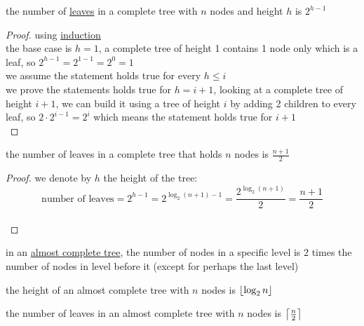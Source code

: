 \documentclass[a4paper,12pt]{article}
\DeclarePairedDelimiter\ceil{\lceil}{\rceil}
\DeclarePairedDelimiter\floor{\lfloor}{\rfloor}
\begin{document}
\begin{lemma}
the number of \hyperref[sec:orge114c93]{leaves} in a complete tree with \(n\) nodes and height \(h\) is \(2^{h-1}\)\\[0pt]
\begin{proof}
using \href{20220707193301-mathematical_induction.org}{induction}\\[0pt]
the base case is \(h=1\), a complete tree of height 1 contains 1 node only which is a leaf, so \(2^{h-1}=2^{1-1}=2^0=1\)\\[0pt]
we assume the statement holds true for every \(h \leq i\)\\[0pt]
we prove the statements holds true for \(h=i+1\), looking at a complete tree of height \(i+1\), we can build it using a tree of height \(i\) by adding 2 children to every leaf, so \(2 \cdot 2^{i-1} = 2^i\) which means the statement holds true for \(i+1\)\\[0pt]
\end{proof}
\end{lemma}

\begin{lemma}
the number of leaves in a complete tree that holds \(n\) nodes is \(\frac{n+1}{2}\)\\[0pt]
\begin{proof}
we denote by \(h\) the height of the tree:\\[0pt]
\[
  \text{number of leaves} = 2^{h-1} = 2^{\log_2(n+1)-1} = \frac{2^{\log_2(n+1)}}{2} = \frac{n+1}{2}
\]\\[0pt]
\end{proof}
\end{lemma}

\begin{lemma}
in an \hyperref[sec:orgcd32ba8]{almost complete tree}, the number of nodes in a specific level is 2 times the number of nodes in level before it (except for perhaps the last level)\\[0pt]
\end{lemma}

\begin{lemma}
the height of an almost complete tree with \(n\) nodes is \(\floor*{\log_2 n}\)\\[0pt]
\end{lemma}

\begin{lemma}
the number of leaves in an almost complete tree with \(n\) nodes is \(\ceil*{\frac{n}{2}}\)\\[0pt]
\end{lemma}
\end{document}
